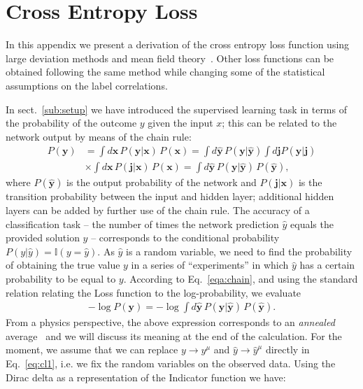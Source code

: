 \documentclass{article}
\begin{document}
\appendix
\section{Cross Entropy Loss} \label{a:loss}
%
In this appendix we present a derivation of the cross entropy loss function using large deviation methods and mean field theory~\cite{mezard}. Other loss functions can be obtained following the same method while changing some of the statistical assumptions on the label correlations.

In sect.~\eqref{sub:setup} we have introduced the supervised learning task in terms of the probability of the outcome $y$ given the input $x$; this can be related to the network output by means of the chain rule:
%
\begin{align} \nonumber
P(\mathbf{y}) &= \int d\mathbf{x} \, P(\mathbf{y} | \mathbf{x}) \, P(\mathbf{x}) = \int d \hat{\mathbf{y}} \, P(\mathbf{y} | \hat{\mathbf{y}} ) \int d\mathbf{j}  P(\hat{\mathbf{y}}|\mathbf{j}) \\
&\times \int d\mathbf{x} \, P(\mathbf{j} | \mathbf{x}) \, P(\mathbf{x})
= \int d \hat{\mathbf{y}} \, P(\mathbf{y} | \hat{\mathbf{y}} ) \, P(\hat{\mathbf{y}}),
\label{eqa:chain}
\end{align}
%
where $P(\hat{\mathbf{y}})$ is the output probability of the network and $ P(\mathbf{j} | \mathbf{x})$ is the transition probability between the input and hidden layer; additional hidden layers can be added by further use of the chain rule. The accuracy of a classification task -- the number of times the network prediction $\hat{y}$ equals the provided solution $y$ -- corresponds to the conditional probability $P(y|\hat{y}) =  \mathbb{I}(y = \hat{y})$. As $\hat{y}$ is a random variable, we need to find the probability of obtaining the true value $y$ in a series of ``experiments'' in which $\hat{y}$  has a certain probability to be equal to $y$. According to Eq.~\eqref{eqa:chain}, and using the standard relation relating the Loss function to the log-probability, we evaluate
%
 \begin{align} \label{eq:cl1}
-\log P(\mathbf{y}) = - \log \int d \hat{\mathbf{y}}\, P(\mathbf{y} | \hat{\mathbf{y}}) \, P(\hat{\mathbf{y}}).
 \end{align}
%
From a physics perspective, the above expression corresponds to an {\it annealed } average~\cite{parisi2, giardina} and we will discuss its meaning at the end of the calculation. For the moment, we assume that we can replace $y \to y^{\mu}$ and $\hat{y} \to \hat{y}^{\mu}$ directly in Eq.~\eqref{eq:cl1}, i.e. we fix the random variables on the observed data. Using the Dirac delta  as a representation of the Indicator function we have:
\end{document}
